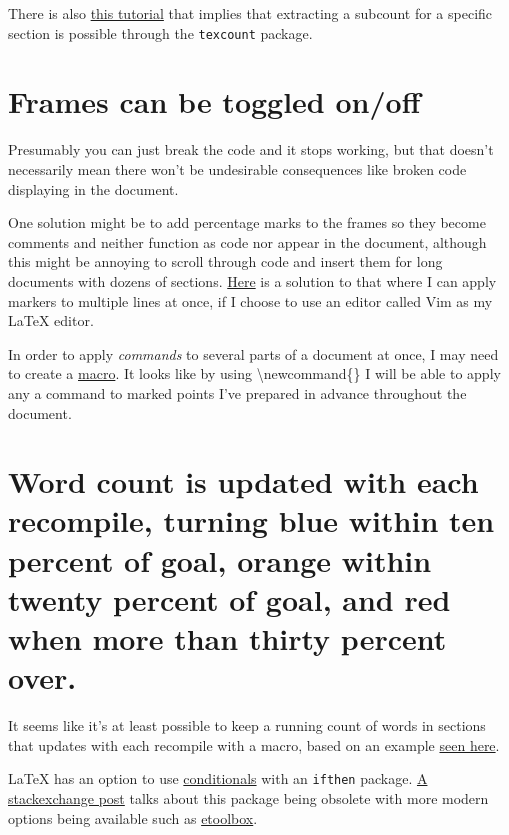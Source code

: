 \documentclass[12pt]{article}
\begin{document}
There is also \href{https://tex.stackexchange.com/questions/44618/dynamically-count-and-return-number-of-words-in-a-section}{this tutorial} that implies that extracting a subcount for a specific section is possible through the \texttt{texcount} package.


\section{\large Frames can be toggled on/off} 

Presumably you can just break the code and it stops working, but that doesn't necessarily mean there won't be undesirable consequences like broken code displaying in the document.

One solution might be to add percentage marks to the frames so they become comments and neither function as code nor appear in the document, although this might be annoying to scroll through code and insert them for long documents with dozens of sections. \href{https://vim.fandom.com/wiki/Inserting_text_in_multiple_lines}{Here} is a solution to that where I can apply markers to multiple lines at once, if I choose to use an editor called Vim as my LaTeX editor.

In order to apply \textit{commands} to several parts of a document at once, I may need to create a \href{https://en.wikibooks.org/wiki/LaTeX/Macros}{macro}. It looks like by using \textbackslash newcommand\{\} I will be able to apply any a command to marked points I've prepared in advance throughout the document.

\section{\large Word count is updated with each recompile, turning blue within ten percent of goal, orange within twenty percent of goal, and red when more than thirty percent over.}

It seems like it's at least possible to keep a running count of words in sections that updates with each recompile with a macro, based on an example \href{https://tex.stackexchange.com/a/44626}{seen here}.

LaTeX has an option to use \href{https://en.wikibooks.org/wiki/LaTeX/Macros#Conditionals}{conditionals} with an \texttt{ifthen} package. \href{https://tex.stackexchange.com/questions/13866/why-is-the-ifthen-package-obsolete}{A stackexchange post} talks about this package being obsolete with more modern options being available such as \href{https://ctan.org/pkg/etoolbox}{etoolbox}.
\end{document}

